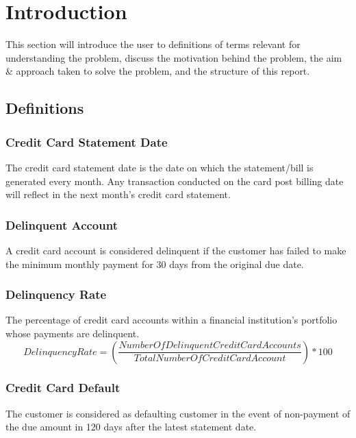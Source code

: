 \documentclass[twoside,11pt,a4paper]{article}
\begin{document}
\section{Introduction}

This section will introduce the user to definitions of terms relevant for understanding the problem, discuss the motivation behind the problem, the aim \& approach taken to solve the problem, and the structure of this report. 


\subsection{Definitions}

\subsubsection{Credit Card Statement Date}
The credit card statement date is the date on which the statement/bill is generated every month. Any transaction conducted on the card post billing date will reflect in the next month's credit card statement.

\subsubsection{Delinquent Account}
A credit card account is considered delinquent if the customer has failed to make the minimum monthly payment for 30 days from the original due date.

\subsubsection{Delinquency Rate}
The percentage of credit card accounts within a financial institution's portfolio whose payments are delinquent.
\begin{equation}
	Delinquency Rate = \left(\frac{Number Of Delinquent Credit Card Accounts}{Total Number Of Credit Card Account}\right) * 100
\end{equation}

\subsubsection{Credit Card Default}
The customer is considered as defaulting customer in the event of non-payment of the due amount in 120 days after the latest statement date.
\end{document}

